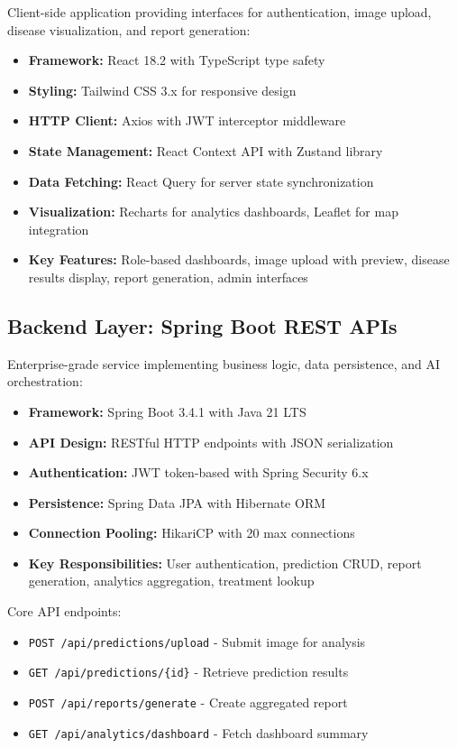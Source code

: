 \documentclass[conference]{IEEEtran}
\begin{document}
Client-side application providing interfaces for authentication, image upload, disease visualization, and report generation:

\begin{itemize}
\item \textbf{Framework:} React 18.2 with TypeScript type safety
\item \textbf{Styling:} Tailwind CSS 3.x for responsive design
\item \textbf{HTTP Client:} Axios with JWT interceptor middleware
\item \textbf{State Management:} React Context API with Zustand library
\item \textbf{Data Fetching:} React Query for server state synchronization
\item \textbf{Visualization:} Recharts for analytics dashboards, Leaflet for map integration
\item \textbf{Key Features:} Role-based dashboards, image upload with preview, disease results display, report generation, admin interfaces
\end{itemize}

\subsection{Backend Layer: Spring Boot REST APIs}

Enterprise-grade service implementing business logic, data persistence, and AI orchestration:

\begin{itemize}
\item \textbf{Framework:} Spring Boot 3.4.1 with Java 21 LTS
\item \textbf{API Design:} RESTful HTTP endpoints with JSON serialization
\item \textbf{Authentication:} JWT token-based with Spring Security 6.x
\item \textbf{Persistence:} Spring Data JPA with Hibernate ORM
\item \textbf{Connection Pooling:} HikariCP with 20 max connections
\item \textbf{Key Responsibilities:} User authentication, prediction CRUD, report generation, analytics aggregation, treatment lookup
\end{itemize}

Core API endpoints:
\begin{itemize}
\item \texttt{POST /api/predictions/upload} - Submit image for analysis
\item \texttt{GET /api/predictions/\{id\}} - Retrieve prediction results
\item \texttt{POST /api/reports/generate} - Create aggregated report
\item \texttt{GET /api/analytics/dashboard} - Fetch dashboard summary
\end{itemize}
\end{document}
